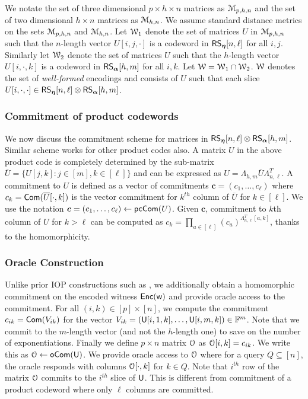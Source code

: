 We notate the set of three dimensional $p\times h\times n$ matrices as $\mathcal{M}_{p,h,n}$ and the set of two dimensional $h\times n$ matrices as $\mathcal{M}_{h, n}$. We assume standard distance metrics on the sets $\mathcal{M}_{p,h,n}$ and $\mathcal{M}_{h,n}$. Let $\mathcal{W}_1$ denote the set of matrices $U$ in $\mathcal{M}_{p,h,n}$ such that the $n$-length vector $U[i,j,\cdot]$ is a
codeword in $\mathsf{RS}_{\bm{\eta}}[n,\ell]$ for all $i,j$. Similarly let $\mathcal{W}_2$ denote the set of matrices $U$ such that the $h$-length vector $U[i,\cdot,k]$ is a codeword in
$\mathsf{RS}_{\bm{\alpha}}[h,m]$ for all $i,k$.  Let $\mathcal{W}=\mathcal{W}_1\cap \mathcal{W}_2$. $\mathcal{W}$ denotes the set of {\em well-formed} encodings  and consists of $U$ such that each slice $U[i,\cdot,\cdot]\in \mathsf{RS}_{\bm{\eta}}[n,\ell]\otimes \mathsf{RS}_{\bm{\alpha}}[h,m]$. 

\subsubsection{Commitment of product codewords}\label{subsec:matrixcommitment}
We now discuss the commitment scheme for matrices in $\mathsf{RS}_{\bm{\eta}}[n,\ell] \otimes \mathsf{RS}_{\bm{\alpha}}[h,m]$. Similar scheme works for other product codes also. A matrix $U$ in the above product code is completely determined by the sub-matrix $\overline{U}=\{U[j,k]: j\in [m], k\in [\ell]\}$ and can be expressed as $U=\Lambda_{h,m}\overline{U}\Lambda_{n,\ell}^T$. 
A commitment to $U$ is defined as  a vector of commitments $\bm{c}=(c_1,\ldots,c_\ell)$ where $c_k=\mathsf{Com}(\overline{U}[\cdot,k])$ is the vector commitment for $k^{th}$ column of $\overline{U}$ for $k\in [\ell]$. We use the notation $\bm{c} = (c_1,\ldots,c_\ell) \leftarrow \mathsf{pcCom}(U)$. Given $\bm{c}$, commitment to $k$th column of $U$ for $k > \ell$ 
can be computed as  $c_k=\prod_{a\in [\ell]}(c_a)^{\Lambda_{n,\ell}^T[a,k]}$, thanks to the homomorphicity. 

\subsubsection{Oracle Construction}\label{subsec:construct_oracle}
Unlike prior IOP constructions such as \cite{ligero, aurora}, we additionally obtain a homomorphic commitment on the encoded witness $\mathsf{Enc}(\mathsf{w})$ and provide oracle access to the commitment. For all $(i,k)\in [p]\times [n]$, we compute the commitment $c_{ik}=\mathsf{Com}(V_{ik})$ for the vector $V_{ik}=(\mathsf{U}[i,1,k],\ldots,\mathsf{U}[i,m,k])\in \mathbb{F}^m$. Note that we commit to the $m$-length vector (and not the $h$-length one)  to save on the number of exponentiations. 
Finally we define $p\times n$ matrix $\mathcal{O}$ as $\mathcal{O}[i,k]=c_{ik}$. We write this as $\mathcal{O} \leftarrow \mathsf{oCom}(\mathsf{U})$. We provide oracle access to $\mathcal{O}$ where for a
query $Q\subseteq [n]$, the oracle responds with columns $\mathcal{O}[\cdot,k]$ for $k\in Q$. Note that $i^{th}$ row of the matrix $\mathcal{O}$ commits to the $i^{th}$ slice of $\mathsf{U}$. This is different from  commitment of a product codeword where only $\ell$ columns are committed.

